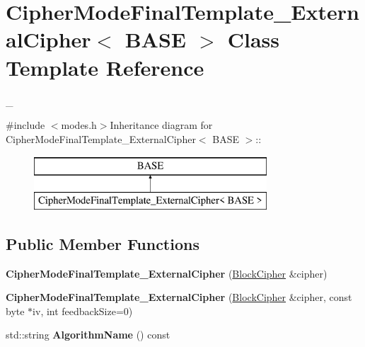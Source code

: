 \hypertarget{class_cipher_mode_final_template___external_cipher}{
\section{CipherModeFinalTemplate\_\-ExternalCipher$<$ BASE $>$ Class Template Reference}
\label{class_cipher_mode_final_template___external_cipher}
}


\_\-  


{\ttfamily \#include $<$modes.h$>$}Inheritance diagram for CipherModeFinalTemplate\_\-ExternalCipher$<$ BASE $>$::\begin{figure}[H]
\begin{center}
\leavevmode
\includegraphics[height=2cm]{class_cipher_mode_final_template___external_cipher}
\end{center}
\end{figure}
\subsection*{Public Member Functions}
\begin{DoxyCompactItemize}
\item 
\hypertarget{class_cipher_mode_final_template___external_cipher_ab183bb3665c750c4555c3d9c8ef9f914}{
{\bfseries CipherModeFinalTemplate\_\-ExternalCipher} (\hyperlink{class_block_cipher}{BlockCipher} \&cipher)}
\label{class_cipher_mode_final_template___external_cipher_ab183bb3665c750c4555c3d9c8ef9f914}

\item 
\hypertarget{class_cipher_mode_final_template___external_cipher_ace2b0390490ab02a18e28d26b1852416}{
{\bfseries CipherModeFinalTemplate\_\-ExternalCipher} (\hyperlink{class_block_cipher}{BlockCipher} \&cipher, const byte $\ast$iv, int feedbackSize=0)}
\label{class_cipher_mode_final_template___external_cipher_ace2b0390490ab02a18e28d26b1852416}

\item 
\hypertarget{class_cipher_mode_final_template___external_cipher_a7b82123ace75c9e733570c50a4a22642}{
std::string {\bfseries AlgorithmName} () const }
\label{class_cipher_mode_final_template___external_cipher_a7b82123ace75c9e733570c50a4a22642}

\end{DoxyCompactItemize}


